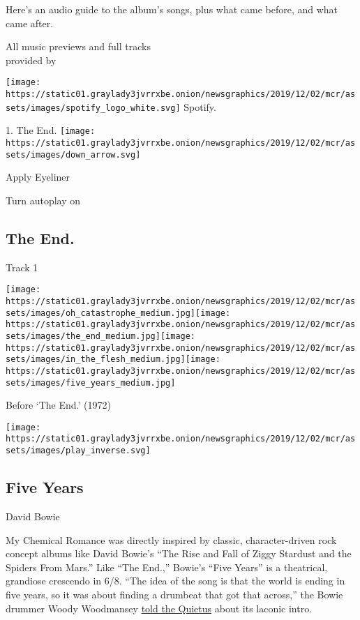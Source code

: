 Here's an audio guide to the album's songs, plus what came before, and
what came after.

All music previews and full tracks\\
provided by

\texttt{[image: https://static01.graylady3jvrrxbe.onion/newsgraphics/2019/12/02/mcr/assets/images/spotify\_logo\_white.svg]}
Spotify.

1. The End.
\texttt{[image: https://static01.graylady3jvrrxbe.onion/newsgraphics/2019/12/02/mcr/assets/images/down\_arrow.svg]}

Apply Eyeliner

Turn autoplay on

\hypertarget{the-end}{%
\subsection{The End.}\label{the-end}}

Track 1

\texttt{[image: https://static01.graylady3jvrrxbe.onion/newsgraphics/2019/12/02/mcr/assets/images/oh\_catastrophe\_medium.jpg]}\texttt{[image: https://static01.graylady3jvrrxbe.onion/newsgraphics/2019/12/02/mcr/assets/images/the\_end\_medium.jpg]}\texttt{[image: https://static01.graylady3jvrrxbe.onion/newsgraphics/2019/12/02/mcr/assets/images/in\_the\_flesh\_medium.jpg]}\texttt{[image: https://static01.graylady3jvrrxbe.onion/newsgraphics/2019/12/02/mcr/assets/images/five\_years\_medium.jpg]}

Before `The End.' (1972)

\texttt{[image: https://static01.graylady3jvrrxbe.onion/newsgraphics/2019/12/02/mcr/assets/images/play\_inverse.svg]}

\hypertarget{five-years}{%
\subsection{Five Years}\label{five-years}}

David Bowie

My Chemical Romance was directly inspired by classic, character-driven
rock concept albums like David Bowie's ``The Rise and Fall of Ziggy
Stardust and the Spiders From Mars.'' Like ``The End.,'' Bowie's ``Five
Years'' is a theatrical, grandiose crescendo in 6/8. ``The idea of the
song is that the world is ending in five years, so it was about finding
a drumbeat that got that across,'' the Bowie drummer Woody Woodmansey
\href{https://thequietus.com/articles/21847-woody-woodmansey-david-bowie-interview-spiders-from-mars?page=2}{told
the Quietus} about its laconic intro.

